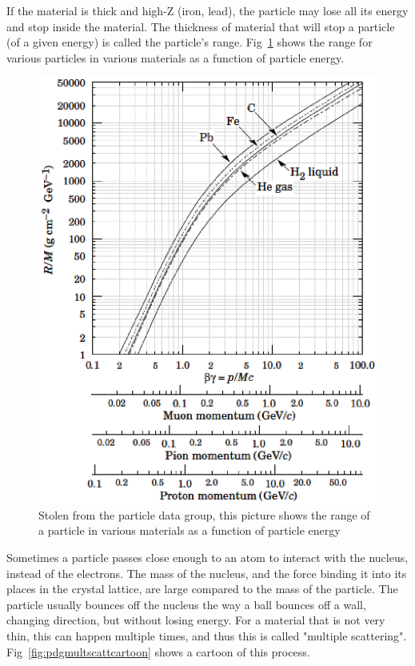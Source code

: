 If the material is thick and high-Z (iron, lead), the particle may lose all its energy and 
stop inside the material.  The thickness of material that will stop a particle (of a given energy) is called the particle's range.  Fig~\ref{fig:pdgrange} shows the range for various particles in various materials as a function of particle energy.


\begin{figure}[h]
\centering\includegraphics[scale=0.5]{./particleinteractions/Pictures/pdgrange.eps}
\caption{Stolen from the particle data group, this picture shows the range of a particle in various materials as a function of particle energy }
\label{fig:pdgrange}
\end{figure}

Sometimes a particle passes close enough to an atom to interact with the nucleus, instead of the electrons.  The mass of the nucleus, and the force binding it into its places in the crystal lattice, are large compared to the mass of the particle.  The particle usually bounces off the nucleus the way a ball bounces off a wall, changing direction, but without losing energy.  For a material that is not very thin, this can happen multiple times, and thus this is called "multiple scattering".  Fig~\ref{fig:pdgmultscattcartoon} shows a cartoon of this process.


